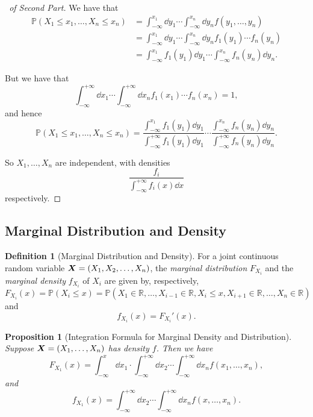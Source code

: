 \documentclass[11pt]{article}
\numberwithin{equation}{section}
\newtheorem{proposition}[theorem]{Proposition}
\theoremstyle{definition}
\newtheorem{definition}[theorem]{Definition}
\theoremstyle{remark}
\newcommand{\pqty}[1]{\left(#1\right)}
\newcommand{\RR}{\mathbb R}
\newcommand{\plusinfty}{+\infty}
\newcommand{\minusinfty}{-\infty}
\newcommand{\Prob}{\mathbb P}
\begin{document}
\begin{proof}[\proofname\ of Second Part]\label{probability-proof-069}
    We have that
    \begin{align*}
        \Prob\pqty{X_1 \leq x_1, \ldots, X_n \leq x_n} &= \int_{\minusinfty}^{x_1} \dd{y_1} \cdots \int_{\minusinfty}^{x_n} \dd{y_n} f\pqty{y_1, \ldots, y_n} \\
        &= \int_{\minusinfty}^{x_1} \dd{y_1} \cdots \int_{\minusinfty}^{x_n} \dd{y_n} f_1\pqty{y_1} \cdots f_n\pqty{y_n} \\
        &= \int_{\minusinfty}^{x_1} f_1\pqty{y_1} \dd{y_1} \cdots \int_{\minusinfty}^{x_n} f_n\pqty{y_n} \dd{y_n}.
    \end{align*}

    But we have that
    \[
        \int_{\minusinfty}^{\plusinfty} \dd{x_1} \cdots \int_{\minusinfty}^{\plusinfty} \dd{x_n} f_1\pqty{x_1} \cdots f_n\pqty{x_n} = 1,
    \]
    and hence
    \[
        \Prob\pqty{X_1 \leq x_1, \ldots, X_n \leq x_n} = \frac{\int_{\minusinfty}^{x_1} f_1\pqty{y_1} \dd{y_1}}{\int_{\minusinfty}^{\plusinfty} f_1\pqty{y_1} \dd{y_1}} \cdots \frac{\int_{\minusinfty}^{x_n} f_n\pqty{y_n} \dd{y_n}}{\int_{\minusinfty}^{\plusinfty} f_n\pqty{y_n} \dd{y_n}}.
    \]

    So \(X_1, \ldots, X_n\) are independent, with densities
    \[
        \frac{f_i}{\int_{\minusinfty}^{\plusinfty} f_i\pqty{x} \dd{x}}
    \]
    respectively.
\end{proof}

\subsection{Marginal Distribution and Density}

\begin{definition}[Marginal Distribution and Density]\label{probability-definition-053}
    \label{probability-def:marginal-distribution-density}%
    For a joint continuous random variable \(\vb{X} = \pqty{X_1, X_2, \ldots, X_n}\), the \emph{marginal distribution} \(F_{X_i}\) and the \emph{marginal density} \(f_{X_i}\) of \(X_i\) are given by, respectively,
    \[
        F_{X_i} \pqty{x} = \Prob\pqty{X_i \leq x} = \Prob\pqty{X_1 \in \RR, \ldots, X_{i - 1} \in \RR, X_i \leq x, X_{i + 1} \in \RR, \ldots, X_n \in \RR}
    \]
    and
    \[
        f_{X_i} \pqty{x} = F_{X_i}'\pqty{x}.
    \]
\end{definition}

\begin{proposition}[Integration Formula for Marginal Density and Distribution]\label{probability-proposition-037}
    \label{probability-prop:marginal-distribution-density-formula}%
    Suppose \(\vb{X} = \pqty{X_1, \ldots, X_n}\) has density \(f\). Then we have
    \[
        F_{X_1} \pqty{x} = \int_{\minusinfty}^{x} \dd{x_1} \cdot \int_{\minusinfty}^{\plusinfty} \dd{x_2} \cdots \int_{\minusinfty}^{\plusinfty} \dd{x_n} f\pqty{x_1, \ldots, x_n},
    \]
    and
    \[
        f_{X_1} \pqty{x} = \int_{\minusinfty}^{\plusinfty} \dd{x_2} \cdots \int_{\minusinfty}^{\plusinfty} \dd{x_n} f\pqty{x, \ldots, x_n}.
    \]
\end{proposition}
\end{document}
